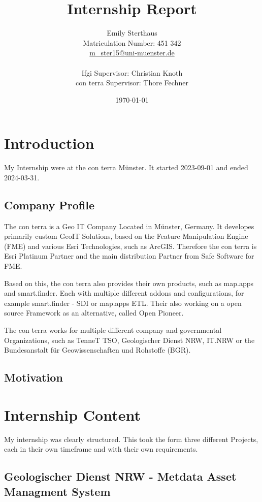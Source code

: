 \documentclass[11pt, titlepage, a4paper]{article}
\title{Internship Report}
\author{Emily Sterthaus \\ Matriculation Number: 451 342 \\ \href{mailto:m_ster15@uni-muenster.de}{m\_ster15@uni-muenster.de}\\ \\
\small Ifgi Supervisor: Christian Knoth\\ \small con terra Supervisor: Thore Fechner
}
\date{\today}
\begin{document}
\maketitle
\newpage
\tableofcontents
\newpage

\section{Introduction}

My Internship were at the con terra Münster. It started 2023-09-01 and ended 2024-03-31.
\subsection{Company Profile}
The con terra is a Geo IT Company Located in Münster, Germany. It developes primarily custom GeoIT Solutions, based on the Feature Manipulation Engine (FME) and various Esri Technologies, such as ArcGIS. Therefore the con terra is Esri Platinum Partner and the main distribution Partner from Safe Software for FME. 

Based on this, the con terra also provides their own products, such as map.apps and smart.finder. Each with multiple different addons and configurations, for example smart.finder - SDI or map.apps ETL. Their also working on a open source Framework as an alternative, called Open Pioneer.   %

The con terra works for multiple different company and governmental Organizations, such as TenneT TSO,  Geologischer Dienst NRW, IT.NRW or the Bundesanstalt für Geowissenschaften und Rohstoffe  (BGR). 

\subsection{Motivation}


\section{Internship Content}

My internship was clearly structured. This took the form three different Projects, each in their own timeframe and with their own requirements. 

\subsection{Geologischer Dienst NRW - Metdata Asset Managment System}
\end{document}
